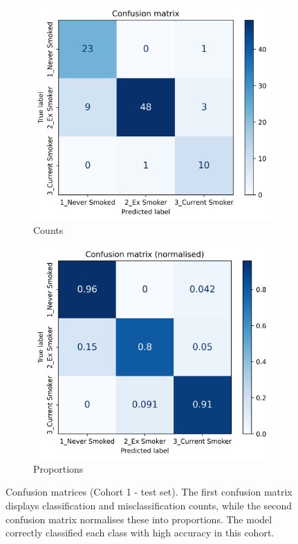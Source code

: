 \documentclass[draft]{article} %
\begin{document}
\begin{figure}[p]
    \centering
    \begin{subfigure}{0.49\linewidth}
        \centering
        \includegraphics[width=\linewidth]{cohort1/test_confusion_matrix.png}
        \caption{Counts}
    \end{subfigure}
    \hfill
    \begin{subfigure}{0.49\linewidth}
        \centering
        \includegraphics[width=\linewidth]{cohort1/test_confusion_matrix_normalised.png}
        \caption{Proportions}
    \end{subfigure}
    \caption[Confusion matrices (Cohort 1)]{Confusion matrices (Cohort 1 - test set). The first confusion matrix displays classification and misclassification counts, while the second confusion matrix normalises these into proportions. The model correctly classified each class with high accuracy in this cohort.}
    \label{fig:cohort1-confusion-matrix}
\end{figure}
\end{document}
